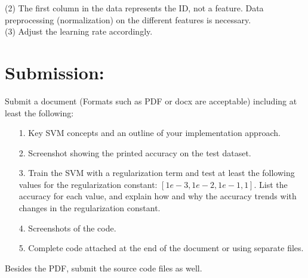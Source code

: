 \documentclass[a4paper]{article}
\theoremstyle{definition}
\begin{document}
(2) The first column in the data represents the ID, not a feature. Data preprocessing (normalization) on the different features is necessary.\\

(3) Adjust the learning rate accordingly.

\section*{Submission:}
Submit a document (Formats such as PDF or docx are acceptable) including at least the following:
\begin{enumerate}
    \item [1.] Key SVM concepts and an outline of your implementation approach.
    \item [2.] Screenshot showing the printed accuracy on the test dataset.

    \item [3.] Train the SVM with a regularization term and test at least the following values for the regularization constant: $[1e-3,1e-2, 1e-1, 1]$. List the accuracy for each value, and explain how and why the accuracy trends with changes in the regularization constant.
    
    \item [4.]  Screenshots of the code.
    \item [5.] Complete code attached at the end of the document or using separate files.
\end{enumerate}

Besides the PDF, submit the source code files as well.



\end{document}

